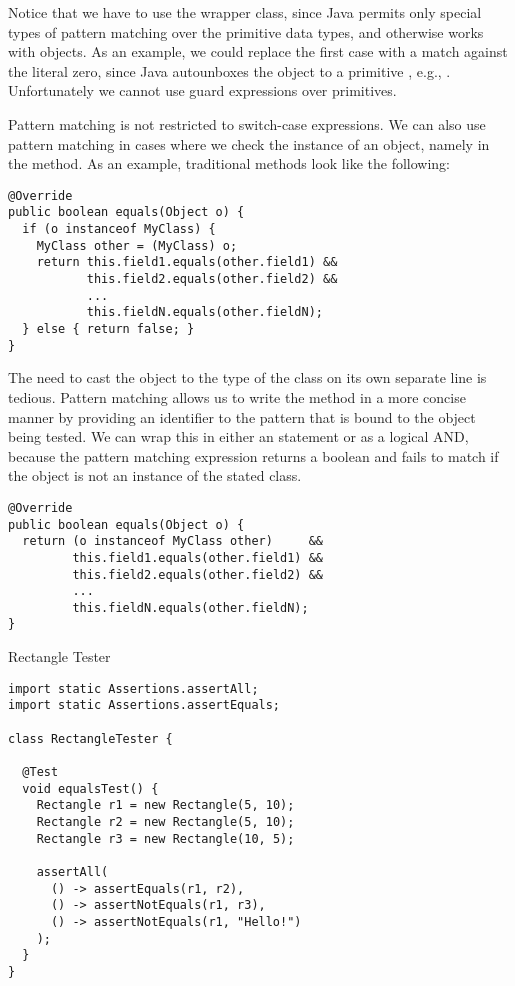 Notice that we have to use the wrapper class, since Java permits only special types of pattern matching over the primitive data types, and otherwise works with objects. As an example, we could replace the first case with a match against the literal zero, since Java autounboxes the  object to a primitive , e.g., . Unfortunately we cannot use guard expressions over primitives.

Pattern matching is not restricted to switch-case expressions. We can also use pattern matching in cases where we check the instance of an object, namely in the  method. As an example, traditional  methods look like the following:

\par{\footnotesize
\begin{verbatim}
@Override
public boolean equals(Object o) {
  if (o instanceof MyClass) {
    MyClass other = (MyClass) o;
    return this.field1.equals(other.field1) &&
           this.field2.equals(other.field2) &&
           ...
           this.fieldN.equals(other.fieldN);
  } else { return false; }
}
\end{verbatim}
}

The need to cast the object to the type of the class on its own separate line is tedious. Pattern matching allows us to write the  method in a more concise manner by providing an identifier to the pattern that is bound to the object being tested. We can wrap this in either an  statement or as a logical AND, because the pattern matching expression returns a boolean and fails to match if the object is not an instance of the stated class.

\par{\footnotesize
\begin{verbatim}
@Override
public boolean equals(Object o) {
  return (o instanceof MyClass other)     &&
         this.field1.equals(other.field1) &&
         this.field2.equals(other.field2) &&
         ...
         this.fieldN.equals(other.fieldN);
}
\end{verbatim}
}


\begin{cl}{Rectangle Tester}
\begin{lstlisting}[language=MyJava]
import static Assertions.assertAll;
import static Assertions.assertEquals;

class RectangleTester {

  @Test
  void equalsTest() {
    Rectangle r1 = new Rectangle(5, 10);
    Rectangle r2 = new Rectangle(5, 10);
    Rectangle r3 = new Rectangle(10, 5);

    assertAll(
      () -> assertEquals(r1, r2),
      () -> assertNotEquals(r1, r3),
      () -> assertNotEquals(r1, "Hello!")
    );
  }
}
\end{lstlisting}
\end{cl}


